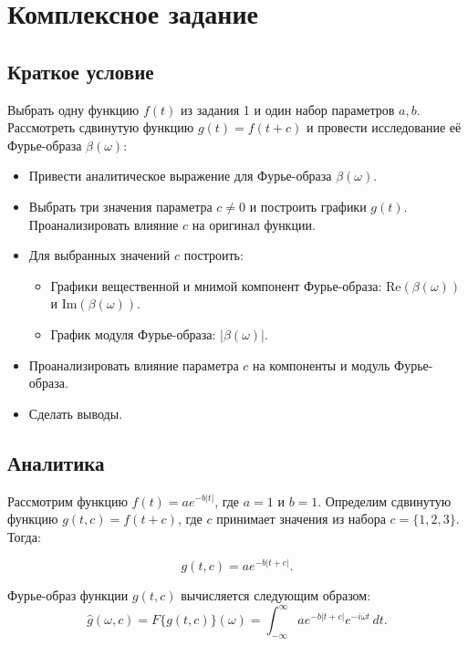 \documentclass[a4paper,12pt]{article}
\begin{document}
\section{Комплексное задание}
\subsection{Краткое условие}
Выбрать одну функцию \( f(t) \) из задания 1 и один набор параметров \( a, b \). Рассмотреть сдвинутую функцию \( g(t) = f(t + c) \) и провести исследование её Фурье-образа \(\beta(\omega)\):

\begin{itemize}
    \item Привести аналитическое выражение для Фурье-образа \(\beta(\omega)\).

    \item Выбрать три значения параметра \( c \neq 0 \) и построить графики \( g(t) \). Проанализировать влияние \( c \) на оригинал функции.

    \item Для выбранных значений \( c \) построить:
    \begin{itemize}
        \item Графики вещественной и мнимой компонент Фурье-образа: \( \text{Re}(\beta(\omega)) \) и \( \text{Im}(\beta(\omega)) \).
        \item График модуля Фурье-образа: \( |\beta(\omega)| \).
    \end{itemize}

    \item Проанализировать влияние параметра \( c \) на компоненты и модуль Фурье-образа.

    \item Сделать выводы.
\end{itemize}




\subsection{Аналитика}


Рассмотрим функцию \( f(t) = a e^{-b |t|} \), где \( a = 1 \) и \( b = 1 \). Определим сдвинутую функцию \( g(t, c) = f(t + c) \), где \( c \) принимает значения из набора \( c = \{1, 2, 3\} \). Тогда:

\[
g(t, c) = a e^{-b |t + c|}.
\]

Фурье-образ функции \( g(t, c) \) вычисляется следующим образом:
\[
\hat{g}(\omega, c) = {F}\{g(t, c)\}(\omega) = \int_{-\infty}^{\infty} a e^{-b |t + c|} e^{-i \omega t} \, dt.
\]
\end{document}
